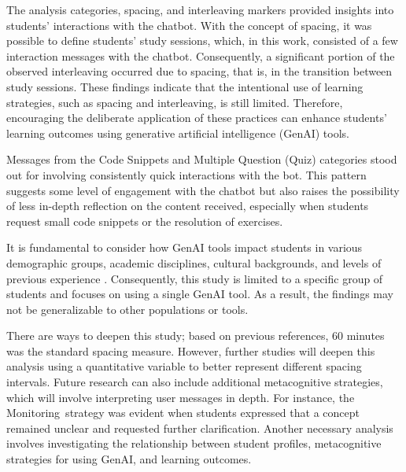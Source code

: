 \documentclass[a4paper,twoside]{article}
\begin{document}
The analysis categories, spacing, and interleaving markers provided insights
into students' interactions with the chatbot. With the concept of spacing, it
was possible to define students' study sessions, which, in this work, consisted
of a few interaction messages with the chatbot. Consequently, a significant
portion of the observed interleaving occurred due to spacing, that is, in the
transition between study sessions. These findings indicate that the intentional
use of learning strategies, such as spacing and interleaving, is still limited.
Therefore, encouraging the deliberate application of these practices can enhance
students' learning outcomes using generative artificial intelligence (GenAI)
tools.

Messages from the Code Snippets and Multiple Question (Quiz) categories stood
out for involving consistently quick interactions with the bot. This pattern
suggests some level of engagement with the chatbot but also raises the
possibility of less in-depth reflection on the content received, especially when
students request small code snippets or the resolution of exercises.

It is fundamental to consider how GenAI tools impact students in various
demographic groups, academic disciplines, cultural backgrounds, and levels of
previous experience \citep{catalan21} \citep{neo22}. Consequently, this study is
limited to a specific group of students and focuses on using a single GenAI
tool. As a result, the findings may not be generalizable to other populations or
tools.

There are ways to deepen this study; based on previous references, 60 minutes
was the standard spacing measure. However, further studies will deepen this
analysis using a quantitative variable to better represent different spacing
intervals. Future research can also include additional metacognitive strategies,
which will involve interpreting user messages in depth. For instance, the
Monitoring strategy was evident when students expressed that a concept remained
unclear and requested further clarification. Another necessary analysis involves
investigating the relationship between student profiles, metacognitive
strategies for using GenAI, and learning outcomes.


{\small
}
\end{document}

